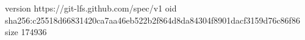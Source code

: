version https://git-lfs.github.com/spec/v1
oid sha256:c25518d66831420ca7aa46eb522b2f864d8da84304f8901dacf3159d76c86f86
size 174936

